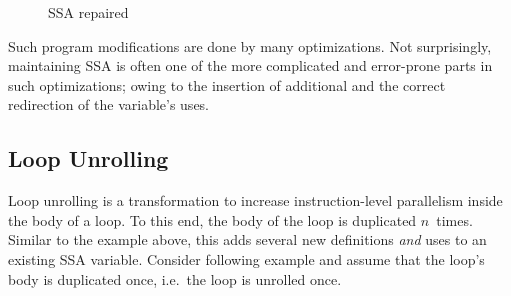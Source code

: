 \begin{figure}[htbp]
	\centering
	\qquad
	\caption{SSA repaired}
	\label{fig:withphis}
\end{figure}

Such program modifications are done by many optimizations. 
Not surprisingly, maintaining SSA is often one of the more complicated and error-prone parts in such optimizations;
owing to the insertion of additional \phifuns and the correct redirection of the variable's uses.

\subsection{Loop Unrolling}

Loop unrolling is a transformation to increase instruction-level parallelism inside the body of a loop.
To this end, the body of the loop is duplicated $n$~times. 
Similar to the example above, this adds several new definitions \emph{and} uses to an existing SSA variable. 
Consider following example and assume that the loop's body is duplicated once, i.e.~the loop is unrolled once.

